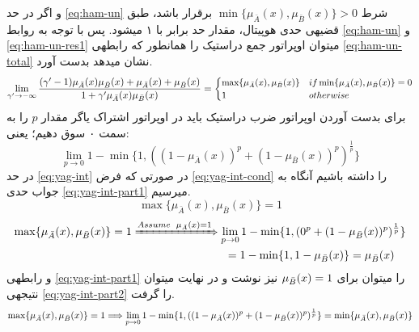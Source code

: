\documentclass[10pt,a4paper]{article}
\newcommand{\نیمفاصله}{\halfspace}
\renewcommand{\ }{\halfspace}
\newcommand{\mba}{\mu_{\bar{A}}}
\newcommand{\mbb}{\mu_{\bar{B}}}
\begin{document}
و اگر در حد
\ref{eq:ham-un}
شرط
$\min\{\mba(x),\mbb(x)\} > 0$
برقرار باشد، طبق قضیه\ ی حدی هوپیتال، مقدار حد برابر با ۱ می\ شود. پس با توجه به روابط
\ref{eq:ham-un} و \ref{eq:ham-un-res1}
می\ توان اوپراتور جمع دراستیک را همانطور که رابطه\ ی
\ref{eq:ham-un-total}
نشان می\ دهد بدست آورد.
\begin{equation}\small
\lim_{\gamma^\prime \rightarrow -\infty} \frac{(\gamma^\prime - 1)\mba(x)\mbb(x) + \mba(x) + \mbb(x)}{1+\gamma^\prime\mba(x)\mbb(x)} = \begin{cases}
\max\{\mba(x),\mbb(x)\} & if \min\{\mba(x),\mbb(x)\} = 0\\
1 & otherwise
\end{cases}
\label{eq:ham-un-total}
\end{equation}
برای بدست آوردن اوپراتور ضرب دراستیک باید در اوپراتور اشتراک یاگر مقدار $p$ را به سمت ۰ سوق دهیم؛ یعنی:
\begin{equation}
\lim_{p \rightarrow 0} 1 - \min\{1, ((1-\mba(x))^p + (1-\mbb(x))^p)^{\frac{1}{p}}\}
\label{eq:yag-int}
\end{equation}
در حد
\ref{eq:yag-int}
در صورتی که فرض
\ref{eq:yag-int-cond}
را داشته باشیم آنگاه به جواب حدی
\ref{eq:yag-int-part1}
می\ رسیم.
\begin{equation}
\max\{\mba(x), \mbb(x)\} = 1
\label{eq:yag-int-cond}
\end{equation}
\begin{equation}
\begin{split}
    \max\{\mba(x), \mbb(x)\} = 1 \xRightarrow{Assume\hspace{5pt}\mba(x) = 1} \lim_{p \rightarrow 0} 1 - \min\{1, (0^p + (1-\mbb(x))^p)^{\frac{1}{p}}\}\\
    = 1 - \min\{1, 1 - \mbb(x)\} = \mbb(x)\hspace{10pt}
\end{split}
\label{eq:yag-int-part1}
\end{equation}
و رابطه\ ی
\ref{eq:yag-int-part1}
را می\ توان برای
${\footnotesize \mbb(x) = 1}$
نیز نوشت و در نهایت می\ توان نتیجه\ ی
\ref{eq:yag-int-part2}
را گرفت.
\vspace{1.4em}\begin{equation}\footnotesize
\max\{\mba(x), \mbb(x)\} = 1 \Longrightarrow \lim_{p \rightarrow 0} 1 - \min\{1, ((1-\mba(x))^p + (1-\mbb(x))^p)^{\frac{1}{p}}\} = \min\{\mba(x) , \mbb(x)\}
\label{eq:yag-int-part2}\vspace{1em}
\end{equation}
\end{document}
